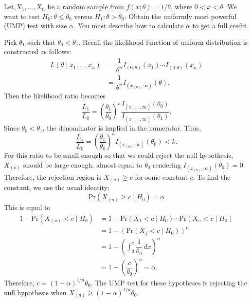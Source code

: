 \documentclass[answers]{exam}
\begin{document}
\begin{questions}
\begin{solution}
\begin{enumerate}
    \end{enumerate}
   \end{solution}
   \question
   Let $X_{1},\ldots,X_{n}$ be a random sample from $f\left(x;\theta\right)=1/\theta$, where $0<x<\theta$. We want to test $H_{0}:\theta\leq\theta_{0}$ versus $H_{1}:\theta>\theta_{0}$. Obtain the uniformly most powerful (UMP) test with size $\alpha$. You must describe how to calculate $\alpha$ to get a full credit.
   \begin{solution}
    Pick $\theta_{1}$ such that $\theta_{0}<\theta_{1}$. Recall the likelihood function of uniform distribution is constructed as follows:
    \begin{align}
      L\left(\theta\;|\;x_{1},\ldots,x_{n}\right) &= \dfrac{1}{\theta^{n}}I_{(0,\theta)}\left(x_{1}\right)\cdots I_{(0,\theta)}\left(x_{n}\right)\\
      &= \dfrac{1}{\theta^{n}}I_{\left(x_{(n)},\infty\right)}\left(\theta\right).
    \end{align}
    Then the likelihood ratio becomes
    $$
      \dfrac{L_{1}}{L_{0}} = \left(\dfrac{\theta_{1}}{\theta_{0}}\right)^{n}\dfrac{I_{\left(x_{(n)},\infty\right)}\left(\theta_{0}\right)}{I_{\left(x_{(n)},\infty\right)}\left(\theta_{1}\right)}.
    $$
    Since $\theta_{0}<\theta_{1}$, the denominator is implied in the numerator. Thus,
    $$
      \dfrac{L_{1}}{L_{0}} = \left(\dfrac{\theta_{1}}{\theta_{0}}\right)^{n}I_{\left(x_{(n)},\infty\right)}\left(\theta_{0}\right)<k.
    $$
    For this ratio to be small enough so that we could reject the null hypothesis, $X_{(n)}$ should be large enough, almost equal to $\theta_{0}$ rendering $I_{\left(x_{(n)},\infty\right)}\left(\theta_{0}\right)=0$. Therefore, the rejection region is $X_{\left(n\right)}\geq c$ for some constant $c$. To find the constant, we use the usual identity:
    $$
      \mathrm{Pr}\left(X_{\left(n\right)}\geq c\;|\;H_{0}\right) = \alpha
    $$
    This is equal to
    \begin{align}
      1-\mathrm{Pr}\left(X_{\left(n\right)}<c\;|\;H_{0}\right) &= 1-\mathrm{Pr}\left(X_{1}<c\;|\;H_{0}\right)\cdots \mathrm{Pr}\left(X_{n}<c\;|\;H_{0}\right)\\
      &= 1-\left(\mathrm{Pr}\left(X_{1}<c\;|\;H_{0}\right)\right)^{n}\\
      &= 1-\left(\int_{0}^{c}\dfrac{1}{\theta_{0}}\,dx\right)^{n}\\
      &= 1-\left(\dfrac{c}{\theta_{0}}\right)^{n} = \alpha.
    \end{align}
    Therefore, $c=\left(1-\alpha\right)^{1/n}\theta_{0}$. The UMP test for these hypotheses is rejecting the null hypothesis when $X_{\left(n\right)}\geq \left(1-\alpha\right)^{1/n}\theta_{0}$.

\end{solution}
\end{questions}
\end{document}
